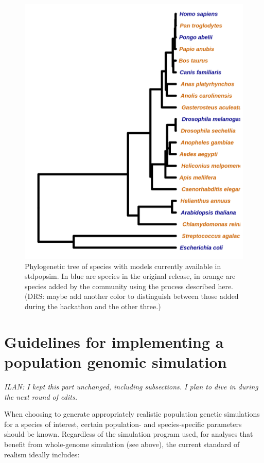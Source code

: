 \documentclass[hidelinks]{article}
\begin{document}
\begin{figure}
	\includegraphics[width=\linewidth]{./figs/species_fig.png}
	\caption{Phylogenetic tree of species with models currently available in stdpopsim. 
		In blue are species in the original release, in orange are species added 
		by the community using the process described here. (DRS: maybe add another
		color to distinguish between those added during the hackathon and the other three.)}
	\label{fig:tree}
\end{figure}


\hypertarget{sec4}{%
	\section*{Guidelines for implementing a population genomic simulation}\label{sec:sim-guidelines}}

\noindent\emph{ILAN: I kept this part unchanged, including subsections.
	I plan to dive in during the next round of edits.\vspace{5pt}}


When choosing to generate appropriately realistic population genetic
simulations for a species of interest, certain population- and species-specific
parameters should be known. Regardless of the simulation program used,
for analyses that benefit from whole-genome simulation (see above), 
the current standard of realism ideally includes:
\end{document}

